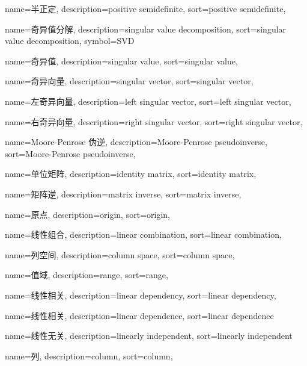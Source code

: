 {
  name=半正定,
  description={positive semidefinite},
  sort={positive semidefinite},
}

{
  name=奇异值分解,
  description={singular value decomposition},
  sort={singular value decomposition},
  symbol={SVD}
}

{
  name=奇异值,
  description={singular value},
  sort={singular value},
}

{
  name=奇异向量,
  description={singular vector},
  sort={singular vector},
}

{
  name=左奇异向量,
  description={left singular vector},
  sort={left singular vector},
}

{
  name=右奇异向量,
  description={right singular vector},
  sort={right singular vector},
}

{
  name=Moore-Penrose 伪逆,
  description={Moore-Penrose pseudoinverse},
  sort={Moore-Penrose pseudoinverse},
}

{
  name=单位矩阵,
  description={identity matrix},
  sort={identity matrix},
}

{
  name=矩阵逆,
  description={matrix inverse},
  sort={matrix inverse},
}

{
  name=原点,
  description={origin},
  sort={origin},
}

{
  name=线性组合,
  description={linear combination},
  sort={linear combination},
}

{
  name=列空间,
  description={column space},
  sort={column space},
}

{
  name=值域,
  description={range},
  sort={range},
}

{
  name=线性相关,
  description={linear dependency},
  sort={linear dependency},
}

{
  name=线性相关,
  description={linear dependence},
  sort={linear dependence}
}

{
  name=线性无关,
  description={linearly independent},
  sort={linearly independent}
}

{
  name=列,
  description={column},
  sort={column},
}

